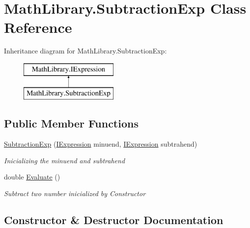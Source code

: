 \hypertarget{class_math_library_1_1_subtraction_exp}{}\section{Math\+Library.\+Subtraction\+Exp Class Reference}
\label{class_math_library_1_1_subtraction_exp}
Inheritance diagram for Math\+Library.\+Subtraction\+Exp\+:\begin{figure}[H]
\begin{center}
\leavevmode
\includegraphics[height=2.000000cm]{class_math_library_1_1_subtraction_exp}
\end{center}
\end{figure}
\subsection*{Public Member Functions}
\begin{DoxyCompactItemize}
\item 
\mbox{\hyperlink{class_math_library_1_1_subtraction_exp_aeb00ffde12800b77590979d7dc15e85e}{Subtraction\+Exp}} (\mbox{\hyperlink{interface_math_library_1_1_i_expression}{I\+Expression}} minuend, \mbox{\hyperlink{interface_math_library_1_1_i_expression}{I\+Expression}} subtrahend)
\begin{DoxyCompactList}\small\item\em Inicializing the minuend and subtrahend \end{DoxyCompactList}\item 
double \mbox{\hyperlink{class_math_library_1_1_subtraction_exp_a768d12e100448596101ce525813609bf}{Evaluate}} ()
\begin{DoxyCompactList}\small\item\em Subtract two number inicialized by Constructor \end{DoxyCompactList}\end{DoxyCompactItemize}


\subsection{Constructor \& Destructor Documentation}
\mbox{\label{class_math_library_1_1_subtraction_exp_aeb00ffde12800b77590979d7dc15e85e}} 
